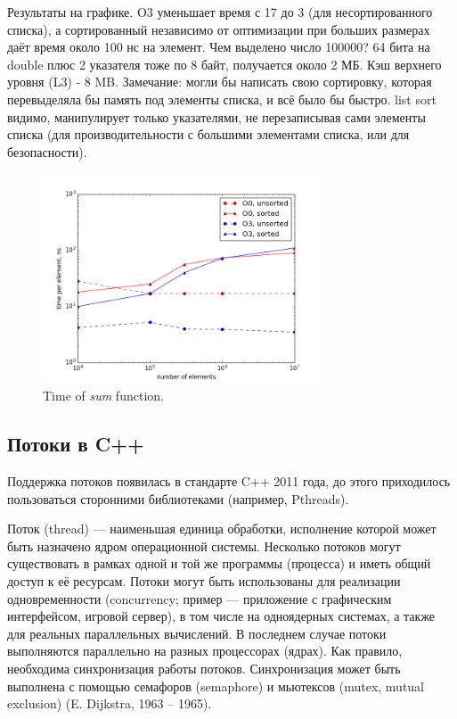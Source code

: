 \documentclass{book}
\begin{document}
Результаты на графике. O3 уменьшает время с 17 до 3 (для несортированного списка), а сортированный
независимо от оптимизации при больших размерах даёт время около 100 нс на элемент. Чем выделено
число 100000? 64 бита на double плюс 2 указателя тоже по 8 байт, получается около 2 МБ. Кэш верхнего
уровня (L3) - 8 MB. Замечание: могли бы написать свою сортировку, которая перевыделяла бы память
под элементы списка, и всё было бы быстро. list sort видимо, манипулирует только указателями, не
перезаписывая сами элементы списка (для производительности с большими элементами списка, или для
безопасности).
\begin{figure}[h]
  \centering
  \includegraphics[width=8.3cm]{cache.png}
    \caption{\label{fig:stereo}Time of {\it sum} function.}
\end{figure}

\subsection{Потоки в C++}

Поддержка потоков появилась в стандарте C++ 2011 года, до этого приходилось
пользоваться сторонними библиотеками (например, Pthreads).

Поток (thread) --- наименьшая единица обработки, исполнение которой может быть
назначено ядром операционной системы. Несколько потоков могут существовать в
рамках одной и той же программы (процесса) и иметь общий доступ к её ресурсам.
Потоки могут быть использованы для реализации одновременности (concurrency;
пример --- приложение с графическим интерфейсом, игровой сервер), в том числе на одноядерных
системах, а также для реальных параллельных вычислений. В последнем случае
потоки выполняются параллельно на разных процессорах (ядрах). Как правило,
необходима синхронизация работы потоков. Синхронизация может быть выполнена с
помощью семафоров (semaphore) и мьютексов (mutex, mutual exclusion) (E.
Dijkstra, 1963 -- 1965).
\end{document}
